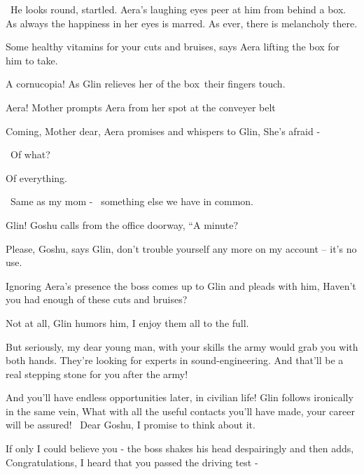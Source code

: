 \documentclass[letterpaper]{article}
\begin{document}
~He looks round, startled. Aera's laughing eyes peer at him from behind a box. As always the happiness in her eyes is
marred. As ever, there is melancholy there. 

{\textquotedbl}Some healthy vitamins for your cuts and bruises,{\textquotedbl} says Aera lifting the box for him to
take. 

{\textquotedbl}A cornucopia!{\textquotedbl} As Glin relieves her of the box~their fingers touch.

{\textquotedbl}Aera!{\textquotedbl} Mother prompts Aera from her spot at the conveyer belt 

{\textquotedbl}Coming, Mother dear,{\textquotedbl} Aera promises and whispers to Glin, {\textquotedbl}She's afraid
-{\textquotedbl} 

~{\textquotedbl}Of what?{\textquotedbl} 

{\textquotedbl}Of everything.{\textquotedbl} 

~{\textquotedbl}Same as my mom - \ something else we have in common.{\textquotedbl}

{\textquotedbl}Glin!{\textquotedbl} Goshu calls from the office doorway, ``A minute?{\textquotedbl} 

{\textquotedbl}Please, Goshu,{\textquotedbl} says Glin, {\textquotedbl}don't trouble yourself any more on my account --
it's no use.{\textquotedbl}

Ignoring Aera's presence the boss comes up to Glin and pleads with him, {\textquotedbl}Haven't you had enough of these
cuts and bruises?{\textquotedbl}

{\textquotedbl}Not at all,{\textquotedbl} Glin humors him, {\textquotedbl}I enjoy them all to the full.{\textquotedbl}

{\textquotedbl}But seriously, my dear young man, with your skills the army would grab you with both hands. They're
looking for experts in sound-engineering. And that'll be a real stepping stone for you after the army!{\textquotedbl} 

{\textquotedbl}And you'll have endless opportunities later, in civilian life!{\textquotedbl} Glin follows
ironically{ }in the same vein, {\textquotedbl}What with all the useful contacts you'll have made, your
career will be assured! ~Dear Goshu, I promise to think about it.{\textquotedbl} 

{{\textquotedbl}If only I could believe you -{\textquotedbl} the boss shakes his head despairingly and
then adds, {\textquotedbl}Congratulations, I heard that you passed the driving test - {\textquotedbl}}
\end{document}

